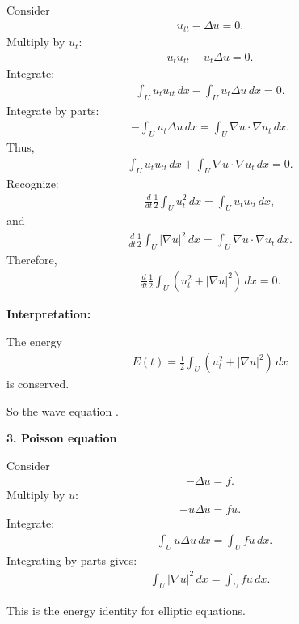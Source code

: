 \documentclass[12pt,a4paper]{report}
\begin{document}
\begin{description}
\begin{description}
Consider
\begin{align*}
u_{tt}-\Delta u=0.
\end{align*}
Multiply by $u_t$:
\begin{align*}
u_tu_{tt}-u_t\Delta u=0.
\end{align*}
Integrate:
\begin{align*}
\int_U u_tu_{tt}\,dx-\int_U u_t\Delta u\,dx=0.
\end{align*}
Integrate by parts:
\begin{align*}
-\int_U u_t\Delta u\,dx=\int_U \nabla u\cdot\nabla u_t\,dx.
\end{align*}
Thus,
\begin{align*}
\int_U u_tu_{tt}\,dx+\int_U \nabla u\cdot\nabla u_t\,dx=0.
\end{align*}
Recognize:
\begin{align*}
\frac{d}{dt}\frac12\int_U u_t^2\,dx = \int_U u_tu_{tt}\,dx,
\end{align*}
and
\begin{align*}
\frac{d}{dt}\frac12\int_U |\nabla u|^2\,dx = \int_U \nabla u\cdot\nabla u_t\,dx.
\end{align*}
Therefore,
\begin{align*}
\boxed{
\frac{d}{dt}\frac12\int_U \left(u_t^2+|\nabla u|^2\right)\,dx=0.
}
\end{align*}

\textbf{Interpretation:}

The energy
\begin{align*}
E(t)=\frac12\int_U(u_t^2+|\nabla u|^2)\,dx
\end{align*}
is conserved.

So the wave equation .

\item \textbf{3. Poisson equation}

Consider
\begin{align*}
-\Delta u=f.
\end{align*}
Multiply by $u$:
\begin{align*}
-u\Delta u=fu.
\end{align*}
Integrate:
\begin{align*}
-\int_U u\Delta u\,dx=\int_U fu\,dx.
\end{align*}
Integrating by parts gives:
\begin{align*}
\boxed{
\int_U |\nabla u|^2\,dx = \int_U fu\,dx.
}
\end{align*}

This is the energy identity for elliptic equations.


\end{description}
\end{description}
\end{document}
